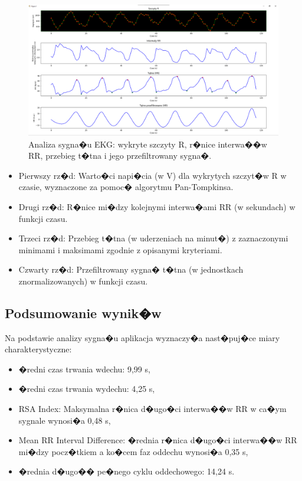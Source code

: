 \begin{figure}[ht]
    \centering
    \includegraphics[scale=0.25]{Rysunki/oddechy.png}
    \caption{Analiza sygna�u EKG: wykryte szczyty R, r�nice interwa��w RR, przebieg t�tna i jego przefiltrowany sygna�.}
    \label{fig/oddechy}
\end{figure}

\begin{itemize}
    \item Pierwszy rz�d: Warto�ci napi�cia (w \textmu{}V) dla wykrytych szczyt�w R w
          czasie, wyznaczone za pomoc� algorytmu Pan-Tompkinsa.
    \item Drugi rz�d: R�nice mi�dzy kolejnymi interwa�ami RR (w sekundach) w funkcji
          czasu.
    \item Trzeci rz�d: Przebieg t�tna (w uderzeniach na minut�) z zaznaczonymi minimami i
          maksimami zgodnie z opisanymi kryteriami.
    \item Czwarty rz�d: Przefiltrowany sygna� t�tna (w jednostkach znormalizowanych) w
          funkcji czasu.
\end{itemize}

\subsection{Podsumowanie wynik�w}
Na podstawie analizy sygna�u aplikacja wyznaczy�a nast�puj�ce miary
charakterystyczne:
\begin{itemize}
    \item �redni czas trwania wdechu: 9,99 s,
    \item �redni czas trwania wydechu: 4,25 s,
    \item {RSA Index}: Maksymalna r�nica d�ugo�ci interwa��w RR w ca�ym sygnale wynosi�a 0,48 s,
    \item {Mean RR Interval Difference}: �rednia r�nica d�ugo�ci interwa��w RR mi�dzy pocz�tkiem a ko�cem faz oddechu wynosi�a 0,35 s,
    \item �rednia d�ugo�� pe�nego cyklu oddechowego: 14,24 s.
\end{itemize}

